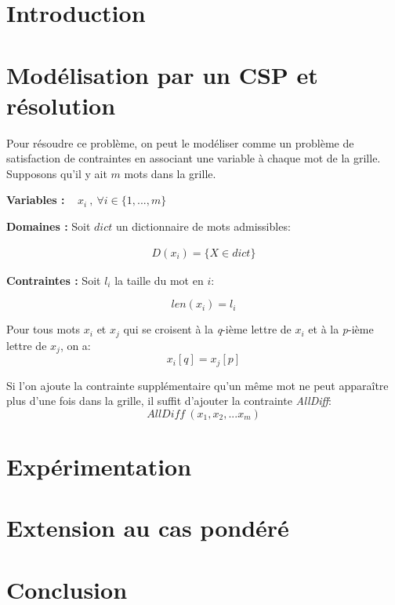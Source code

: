 \documentclass[11pt, letterpaper]{article}
\begin{document}
\section*{Introduction}

\section{Mod\'{e}lisation par un CSP et r\'{e}solution}

Pour r\'{e}soudre ce probl\`{e}me, on peut le mod\'{e}liser comme un probl\`{e}me de satisfaction de contraintes en associant une variable \`{a} chaque mot de la grille. Supposons qu'il y ait $m$ mots dans la grille. \bigskip

\textbf{Variables :} ~ $x_{i}~,~\forall i \in \{1,...,m\}$

\bigskip

\textbf{Domaines :} Soit $dict$ un dictionnaire de mots admissibles:

\begin{align*}
D(x_{i}) = \{ X \in dict \}
\end{align*}

\bigskip

\textbf{Contraintes :} Soit $l_{i}$ la taille du mot en $i$:

\begin{equation} 
len(x_{i}) = l_{i}
\end{equation}
\par
Pour tous mots $x_{i}$ et $x_{j}$ qui se croisent \`{a} la \textit{q}-i\`{e}me lettre de $x_{i}$ et \`{a} la \textit{p}-i\`{e}me lettre de $x_{j}$, on a:
\begin{equation} 
x_{i}[q] = x_{j}[p]
\end{equation}
\par
Si l'on ajoute la contrainte suppl\'{e}mentaire qu'un m\^{e}me mot ne peut appara\^{i}tre plus d'une fois dans la grille, il suffit d'ajouter la contrainte \textit{AllDiff}:
\begin{equation} 
\textit{AllDiff}~(x_{1},x_{2},...x_{m})
\end{equation}

\section{Exp\'{e}rimentation}

\section{Extension au cas pond\'{e}r\'{e}}

\newpage

\section*{Conclusion}
\end{document}
